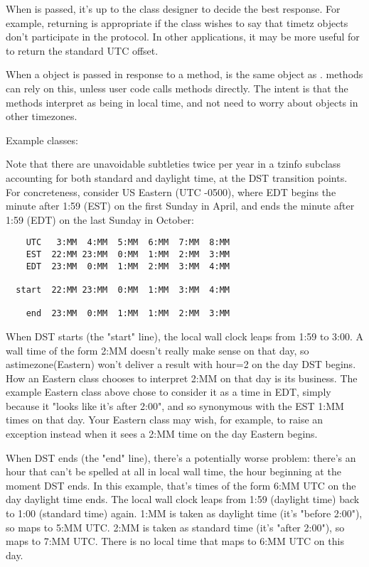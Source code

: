 When  is passed, it's up to the class designer to decide the
best response.  For example, returning  is appropriate if the
class wishes to say that timetz objects don't participate in the
 protocol.  In other applications, it may be more useful
for  to return the standard UTC offset.

When a  object is passed in response to a
 method,  is the same object as
.   methods can rely on this, unless
user code calls  methods directly.  The intent is that
the  methods interpret  as being in local time,
and not need to worry about objects in other timezones.

Example  classes:



Note that there are unavoidable subtleties twice per year in a tzinfo
subclass accounting for both standard and daylight time, at the DST
transition points.  For concreteness, consider US Eastern (UTC -0500),
where EDT begins the minute after 1:59 (EST) on the first Sunday in
April, and ends the minute after 1:59 (EDT) on the last Sunday in October:

\begin{verbatim}
    UTC   3:MM  4:MM  5:MM  6:MM  7:MM  8:MM
    EST  22:MM 23:MM  0:MM  1:MM  2:MM  3:MM
    EDT  23:MM  0:MM  1:MM  2:MM  3:MM  4:MM

  start  22:MM 23:MM  0:MM  1:MM  3:MM  4:MM

    end  23:MM  0:MM  1:MM  1:MM  2:MM  3:MM
\end{verbatim}

When DST starts (the "start" line), the local wall clock leaps from 1:59
to 3:00.  A wall time of the form 2:MM doesn't really make sense on that
day, so astimezone(Eastern) won't deliver a result with hour=2 on the
day DST begins.  How an Eastern class chooses to interpret 2:MM on
that day is its business.  The example Eastern class above chose to
consider it as a time in EDT, simply because it "looks like it's
after 2:00", and so synonymous with the EST 1:MM times on that day.
Your Eastern class may wish, for example, to raise an exception instead
when it sees a 2:MM time on the day Eastern begins.

When DST ends (the "end" line), there's a potentially worse problem:
there's an hour that can't be spelled at all in local wall time, the
hour beginning at the moment DST ends.  In this example, that's times of
the form 6:MM UTC on the day daylight time ends.  The local wall clock
leaps from 1:59 (daylight time) back to 1:00 (standard time) again.
1:MM is taken as daylight time (it's "before 2:00"), so maps to 5:MM UTC.
2:MM is taken as standard time (it's "after 2:00"), so maps to 7:MM UTC.
There is no local time that maps to 6:MM UTC on this day.

